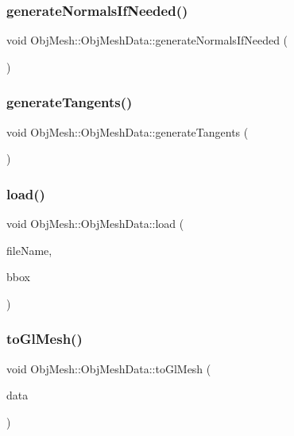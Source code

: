 \subsubsection{\texorpdfstring{generateNormalsIfNeeded()}{generateNormalsIfNeeded()}}
{\footnotesize\ttfamily void Obj\+Mesh\+::\+Obj\+Mesh\+Data\+::generate\+Normals\+If\+Needed (\begin{DoxyParamCaption}{ }\end{DoxyParamCaption})}

\mbox{\label{class_obj_mesh_1_1_obj_mesh_data_ae264e93b60d2d0b898754b026de38d94}} 
\subsubsection{\texorpdfstring{generateTangents()}{generateTangents()}}
{\footnotesize\ttfamily void Obj\+Mesh\+::\+Obj\+Mesh\+Data\+::generate\+Tangents (\begin{DoxyParamCaption}{ }\end{DoxyParamCaption})}

\mbox{\label{class_obj_mesh_1_1_obj_mesh_data_aafd7954d3e645958b1a533f1e875c2f6}} 
\subsubsection{\texorpdfstring{load()}{load()}}
{\footnotesize\ttfamily void Obj\+Mesh\+::\+Obj\+Mesh\+Data\+::load (\begin{DoxyParamCaption}\item[{const char $\ast$}]{file\+Name,  }\item[{\mbox{\hyperlink{class_aabb}{Aabb}} \&}]{bbox }\end{DoxyParamCaption})}

\mbox{\label{class_obj_mesh_1_1_obj_mesh_data_ab6688d87c9cee459d1b1c0813fa360ef}} 
\subsubsection{\texorpdfstring{toGlMesh()}{toGlMesh()}}
{\footnotesize\ttfamily void Obj\+Mesh\+::\+Obj\+Mesh\+Data\+::to\+Gl\+Mesh (\begin{DoxyParamCaption}\item[{\mbox{\hyperlink{class_obj_mesh_1_1_gl_mesh_data}{Gl\+Mesh\+Data}} \&}]{data }\end{DoxyParamCaption})}



